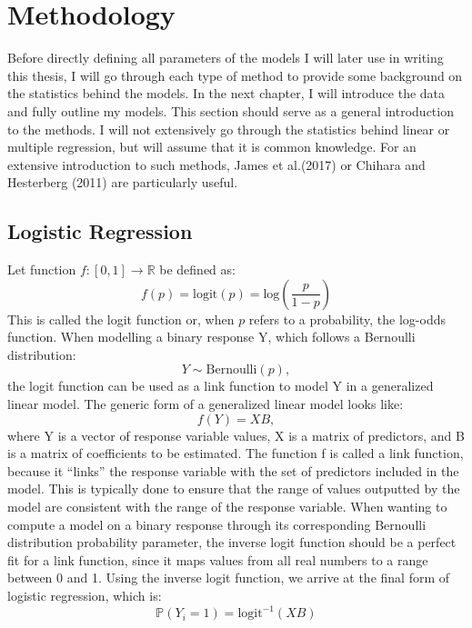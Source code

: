 \documentclass[12pt,twoside]{reedthesis}
\begin{document}
  \section{Methodology}\label{methodology}
  
  Before directly defining all parameters of the models I will later use
  in writing this thesis, I will go through each type of method to provide
  some background on the statistics behind the models. In the next
  chapter, I will introduce the data and fully outline my models. This
  section should serve as a general introduction to the methods. I will
  not extensively go through the statistics behind linear or multiple
  regression, but will assume that it is common knowledge. For an
  extensive introduction to such methods, James et al.(2017) or Chihara
  and Hesterberg (2011) are particularly useful.
  
  \subsection{Logistic Regression}\label{logistic-regression}
  
  Let function \(f : [0, 1] \to \mathbb{R}\) be defined as:
  \[f(p) = \text{logit}(p) = \text{log}\left( \frac{p}{1-p} \right)\] This
  is called the logit function or, when \(p\) refers to a probability, the
  log-odds function. When modelling a binary response Y, which follows a
  Bernoulli distribution: \[Y \sim \text{Bernoulli}(p),\] the logit
  function can be used as a link function to model Y in a generalized
  linear model. The generic form of a generalized linear model looks
  like:\\
  \[f(Y) = XB,\] where Y is a vector of response variable values, X is a
  matrix of predictors, and B is a matrix of coefficients to be estimated.
  The function f is called a link function, because it ``links'' the
  response variable with the set of predictors included in the model. This
  is typically done to ensure that the range of values outputted by the
  model are consistent with the range of the response variable. When
  wanting to compute a model on a binary response through its
  corresponding Bernoulli distribution probability parameter, the inverse
  logit function should be a perfect fit for a link function, since it
  maps values from all real numbers to a range between 0 and 1. Using the
  inverse logit function, we arrive at the final form of logistic
  regression, which is:\\
  \[\mathbb{P} (Y_i = 1) = \text{logit}^{-1} (XB)\]
  
\end{document}
